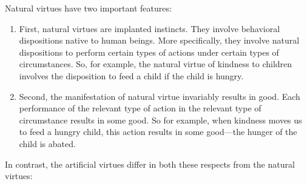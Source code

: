 
Natural virtues have two important features:

\begin{enumerate}
	\item First, natural virtues are implanted instincts. They involve behavioral dispositions native to human beings. More specifically, they involve natural dispositions to perform certain types of actions under certain types of circumstances. So, for example, the natural virtue of kindness to children involves the disposition to feed a child if the child is hungry.
    \item Second, the manifestation of natural virtue invariably results in good. Each performance of the relevant type of action in the relevant type of circumstance results in some good. So for example, when kindness moves us to feed a hungry child, this action results in some good---the hunger of the child is abated.
\end{enumerate}

In contrast, the artificial virtues differ in both these respects from the natural virtues:

